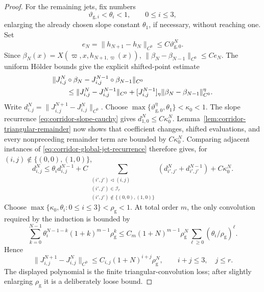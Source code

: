 \documentclass[11pt]{amsart}
\numberwithin{equation}{section}
\theoremstyle{definition}
\theoremstyle{remark}
\begin{document}
\begin{proof}
For the remaining jets, fix numbers
\begin{equation}\label{eq:corridor-adjacent-jet-contractions}
 \vartheta_{\mathrm g,i}<\theta_i<1,
 \qquad 0\le i\le3,
\end{equation}
enlarging the already chosen slope constant $\theta_1$, if necessary,
without reaching one.  Set
\[
 e_N=\|h_{N+1}-h_N\|_{C^0}
 \le C\vartheta_{\mathrm g,0}^{N}.
\]
Since $\beta_N(x)=X(\varpi,x,h_{N+1,\varpi}(x))$,
$\|\beta_N-\beta_{N-1}\|_{C^0}\le Ce_N$.  The uniform H\"older bounds
give the explicit shifted-point estimate
\begin{align}
 &\|J_{i,j}^{N}\circ\beta_N
      -J_{i,j}^{N-1}\circ\beta_{N-1}\|_{C^0}\notag\\
 &\qquad\le
 \|J_{i,j}^{N}-J_{i,j}^{N-1}\|_{C^0}
 +[J_{i,j}^{N-1}]_\eta
       \|\beta_N-\beta_{N-1}\|_{C^0}^{\eta}.
 \label{eq:corridor-shifted-cauchy-estimate}
\end{align}
Write
$d_{i,j}^N=\|J_{i,j}^{N+1}-J_{i,j}^{N}\|_{C^0}$.
Choose
$\max\{\vartheta_{\mathrm g,0}^{\eta},\theta_1\}<\kappa_0<1$.
The slope recurrence \eqref{eq:corridor-slope-cauchy} gives
$d_{1,0}^N\le C\kappa_0^N$.  Lemma~\ref{lem:corridor-triangular-remainder}
now shows that coefficient changes, shifted evaluations, and every
nonpreceding remainder term are bounded by $C\kappa_0^N$.  Comparing
adjacent instances of \eqref{eq:corridor-global-jet-recurrence} therefore
gives, for $(i,j)\notin\{(0,0),(1,0)\}$,
\begin{equation}\label{eq:corridor-jet-difference-recurrence}
 d_{i,j}^{N}
  \le\theta_i d_{i,j}^{N-1}
  +C\!\sum_{\substack{(i',j')\triangleleft(i,j)\\
                       (i',j')\in\mathcal I_r\\
                       (i',j')\notin\{(0,0),(1,0)\}}}
       (d_{i',j'}^N+d_{i',j'}^{N-1})+C\kappa_0^N.
\end{equation}
Choose
$\max\{\kappa_0,\theta_i:0\le i\le3\}<\rho_{\mathrm g}<1$.  At total order
$m$, the only convolution required by the induction is bounded by
\begin{equation}\label{eq:corridor-geometric-convolution}
 \sum_{k=0}^{N-1}\theta_i^{N-1-k}(1+k)^{m-1}\rho_{\mathrm g}^k
 \le C_m(1+N)^{m-1}\rho_{\mathrm g}^{N}
      \sum_{\ell\ge0}(\theta_i/\rho_{\mathrm g})^\ell.
\end{equation}
Hence
\begin{equation}\label{eq:corridor-jet-cauchy}
 \|J_{i,j}^{N+1}-J_{i,j}^{N}\|_{C^0}
 \le C_{i,j}(1+N)^{i+j}\rho_{\mathrm g}^N,
 \qquad i+j\le3,\quad j\le r.
\end{equation}
The displayed polynomial is the finite triangular-convolution loss; after
slightly enlarging $\rho_{\mathrm g}$ it is a deliberately loose bound.


\end{proof}
\end{document}
